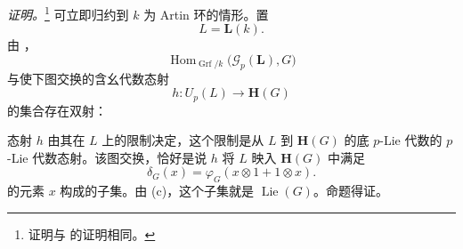 \textit{证明。}\footnote{\label{sga3:VIIB:nde:136}证明与  的证明相同。}
可立即归约到 \(k\) 为 Artin 环的情形。置
\[
  L=\mathbf L(k).
\]
由 ，
\[
  \operatorname{Hom}_{\operatorname{Grf}/k}
    \bigl(\mathscr G_p(\mathbf L),G\bigr)
\]
与使下图交换的含幺代数态射
\[
  h:U_p(L)\longrightarrow\mathbf H(G)
\]
的集合存在双射：
\begin{center}
  \label{sga3:VIIB:4.2.2:restricted-universal-diagram}
  
\end{center}
态射 \(h\) 由其在 \(L\) 上的限制决定，这个限制是从 \(L\) 到 \(\mathbf H(G)\) 的底 \(p\)-Lie 代数的 \(p\)-Lie 代数态射。该图交换，恰好是说 \(h\) 将 \(L\) 映入 \(\mathbf H(G)\) 中满足
\[
  \delta_G(x)
  =
  \varphi_G(x\otimes1+1\otimes x).
\]
的元素 \(x\) 构成的子集。由 \textup{(c)}，这个子集就是 \(\operatorname{Lie}(G)\)。命题得证。
